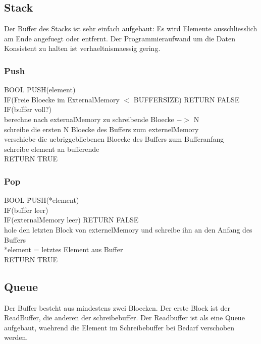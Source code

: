 \documentclass[10pt,a4paper]{article}
\begin{document}
\subsection{Stack}
Der Buffer des Stacks ist sehr einfach aufgebaut: Es wird Elemente ausschliesslich am Ende angefuegt oder entfernt. Der Programmieraufwand um die Daten Konsistent zu halten ist verhaeltnismaessig gering.
\subsubsection{Push}
\begin{tabbing}
BOOL \= PUSH(element)\\
	\> IF(Freie Bloecke im ExternalMemory $<$ BUFFERSIZE) RETURN FALSE \\
	\> IF(bu\= ffer voll?)\\
		\>\> berechne nach externalMemory zu schreibende Bloecke $->$ N\\
		\>\> schreibe die ersten N Bloecke des Buffers zum externelMemory\\
		\>\> verschiebe die uebriggebliebenen Bloecke des Buffers zum Bufferanfang\\
	\> schreibe element an bufferende\\
	\> RETURN TRUE\\
\end{tabbing}
\subsubsection{Pop}
\begin{tabbing}
BOOL \= PUSH(*element)\\
	\> IF(bu\= ffer leer)\\
		\>\> IF(externalMemory leer) RETURN FALSE\\
		\>\> hole den letzten Block von externelMemory und schreibe ihn an den Anfang des Buffers\\
	\> *element = letztes Element aus Buffer\\
	\> RETURN TRUE\\
\end{tabbing}
\subsection{Queue}
Der Buffer besteht aus mindestens zwei Bloecken. Der erste Block ist der ReadBuffer, die anderen der schreibebuffer. Der Readbuffer ist als eine Queue aufgebaut, waehrend die Element im Schreibebuffer bei Bedarf verschoben werden.
\end{document}
